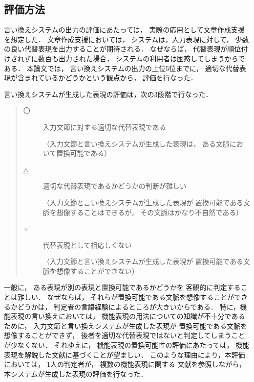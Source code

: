 \documentclass[japanese]{jnlp_1.4}
\begin{document}
\subsection{評価方法}

言い換えシステムの出力の評価にあたっては，
実際の応用として文章作成支援を想定した．
文章作成支援においては，
システムは，入力表現に対して，
少数の良い代替表現を出力することが期待される．
なぜならば，
代替表現が順位付けされずに数百も出力された場合，
システムの利用者は困惑してしまうからである．
本論文では，
言い換えシステムの出力の上位5位までに，
適切な代替表現が含まれているかどうかという観点から，
評価を行なった．

言い換えシステムが生成した表現の評価は，次の3段階で行なった．
\begin{quote}
\begin{description}
\item[〇] 入力文節に対する適切な代替表現である

           （入力文節と言い換えシステムが生成した表現は，
           ある文脈において置換可能である）
\item[△] 適切な代替表現であるかどうかの判断が難しい

           （入力文節と言い換えシステムが生成した表現が
           置換可能である文脈を想像することはできるが，
           その文脈はかなり不自然である）

\item[×] 代替表現として相応しくない
           
           （入力文節と言い換えシステムが生成した表現が
           置換可能である文脈を想像することができない）
\end{description}
\end{quote}
一般に，
ある表現が別の表現と置換可能であるかどうかを
客観的に判定することは難しい．
なぜならば，
それらが置換可能である文脈を想像することができるかどうかは，
判定者の言語経験によるところが大きいからである．
特に，機能表現の言い換えにおいては，
機能表現の用法についての知識が不十分であるために，
入力文節と言い換えシステムが生成した表現が
置換可能である文脈を想像することができず，
後者を適切な代替表現ではないと判定してしまうことが少なくない．
それゆえに，
機能表現の置換可能性の評価にあたっては，
機能表現を解説した文献に基づくことが望ましい．
このような理由により，本評価においては，
1人の判定者が，
複数の機能表現に関する
文献を参照しながら，
本システムが生成した表現の評価を行なった．
\end{document}
